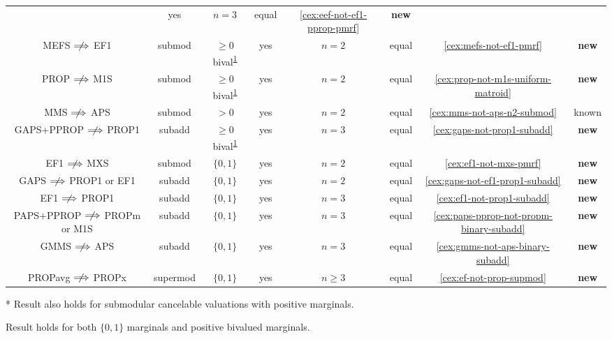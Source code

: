 \begin{table}[p]
\begin{tabular}{cccccccc}
    & yes & $n=3$ & equal & \cref{cex:eef-not-ef1-pprop-pmrf} & \textbf{new}
\\[\defaultaddspace] MEFS $\nfimplies$ EF1
    & submod & $\ge 0$ bival\textsuperscript{\ref{foot:nonneg-bival}}
    & yes & $n=2$ & equal & \cref{cex:mefs-not-ef1-pmrf} & \textbf{new}
\\[\defaultaddspace] PROP $\nfimplies$ M1S
    & submod & $\ge 0$ bival\textsuperscript{\ref{foot:nonneg-bival}}
    & yes & $n=2$ & equal & \cref{cex:prop-not-m1s-uniform-matroid} & \textbf{new}
\\[\defaultaddspace] MMS $\nfimplies$ APS
    & submod & $> 0$ & yes & $n=2$ & equal & \cref{cex:mms-not-aps-n2-submod} & known
\\[\defaultaddspace] GAPS+PPROP $\nfimplies$ PROP1
    & subadd & $\ge 0$ bival\textsuperscript{\ref{foot:nonneg-bival}}
    & yes & $n=3$ & equal & \cref{cex:gaps-not-prop1-subadd} & \textbf{new}
%
\\\midrule EF1 $\nfimplies$ MXS
    & submod & $\{0, 1\}$ & yes & $n=2$ & equal & \cref{cex:ef1-not-mxs-pmrf} & \textbf{new}
\\[\defaultaddspace] GAPS $\nfimplies$ PROP1 or EF1
    & subadd & $\{0, 1\}$ & yes & $n=2$ & equal & \cref{cex:gaps-not-ef1-prop1-subadd} & \textbf{new}
\\[\defaultaddspace] EF1 $\nfimplies$ PROP1
    & subadd & $\{0, 1\}$ & yes & $n=3$ & equal & \cref{cex:ef1-not-prop1-subadd} & \textbf{new}
\\[\defaultaddspace] \hfill\makecell[l]{PAPS+PPROP \\ $\nfimplies$ PROPm or M1S}\hfill
    & subadd & $\{0, 1\}$ & yes & $n=3$ & equal & \cref{cex:paps-pprop-not-propm-binary-subadd} & \textbf{new}
\\[\defaultaddspace] GMMS $\nfimplies$ APS
    & subadd & $\{0, 1\}$ & yes & $n=3$ & equal & \cref{cex:gmms-not-aps-binary-subadd} & \textbf{new}
\\[\defaultaddspace] PROPavg $\nfimplies$ PROPx
    & supermod & $\{0, 1\}$ & yes & $n \ge 3$ & equal & \cref{cex:ef-not-prop-supmod} & \textbf{new}
\\ \bottomrule
\end{tabular}

\begin{tightenum}
\item[*] \label{foot:unit-dem}Result also holds for
    submodular cancelable valuations with positive marginals.
\item[\textdagger] \label{foot:nonneg-bival}Result holds for both
    $\{0, 1\}$ marginals and positive bivalued marginals.
\end{tightenum}
\end{table}
\let\defaultFloatPlacement\oldFp
